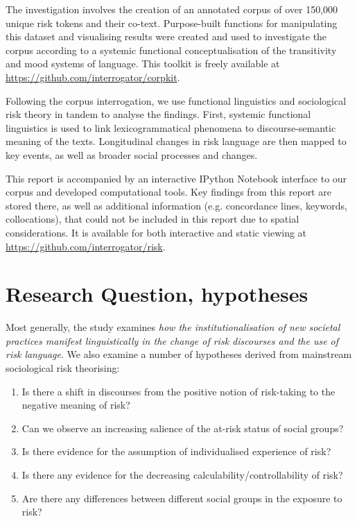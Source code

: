 \documentclass{report}
\begin{document}
The investigation involves the creation of an annotated corpus of over 150,000 unique risk tokens and their co-text. Purpose-built functions for manipulating this dataset and visualising results were created and used to investigate the corpus according to a systemic functional conceptualisation of the transitivity and mood systems of language. This toolkit is freely available at \url{https://github.com/interrogator/corpkit}. 

Following the corpus interrogation, we use functional linguistics and sociological risk theory in tandem to analyse the findings. First, systemic functional linguistics is used to link lexicogrammatical phenomena to discourse-semantic meaning of the texts. Longitudinal changes in risk language are then mapped to key events, as well as broader social processes and changes.

This report is accompanied by an interactive IPython Notebook interface to our corpus and developed computational tools. Key findings from this report are stored there, as well as additional information (e.g. concordance lines, keywords, collocations), that could not be included in this report due to spatial considerations. It is available for both interactive and static viewing at \url{https://github.com/interrogator/risk}.

\section{Research Question, hypotheses} 

Most generally, the study examines \emph{how the institutionalisation of new societal practices manifest linguistically in the change of risk discourses and the use of risk language}. We also examine a number of hypotheses derived from mainstream sociological risk theorising:

\begin{enumerate}
\item Is there a shift in discourses from the positive notion of risk-taking to the negative meaning of risk?
\item Can we observe an increasing salience of the at-risk status of social groups?
\item Is there evidence for the assumption of individualised experience of risk?
\item Is there any evidence for the decreasing calculability/controllability of risk?
\item Are there any differences between different social groups in the exposure to risk?
\end{enumerate}
\end{document}
